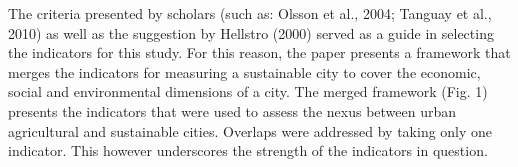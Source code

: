 The criteria presented by scholars (such as: Olsson et al., 2004; Tanguay et al., 2010) as well as the suggestion by Hellstro (2000) served as a guide in selecting the indicators for this study. For this reason, the paper presents a framework that merges the indicators for measuring a sustainable city to cover the economic, social and environmental dimensions of a city. The merged framework (Fig. 1) presents the indicators that were used to assess the nexus between urban agricultural and sustainable cities. Overlaps were addressed by taking only one indicator. This however underscores the strength of the indicators in question.


